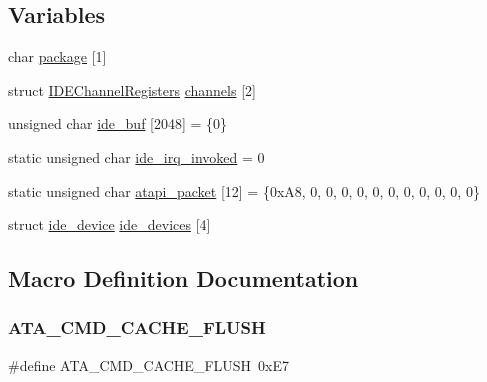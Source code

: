 \subsection*{Variables}
\begin{DoxyCompactItemize}
\item 
char \hyperlink{a00005_ae11222fc133cc5f2cb1b16155fee8b43_ae11222fc133cc5f2cb1b16155fee8b43}{package} \mbox{[}1\mbox{]}
\item 
struct \hyperlink{a00069}{I\+D\+E\+Channel\+Registers} \hyperlink{a00005_aecefa15f62cf60846ddb1a56f9153143_aecefa15f62cf60846ddb1a56f9153143}{channels} \mbox{[}2\mbox{]}
\item 
unsigned char \hyperlink{a00005_a94f78e77f368421e4fe8faea979d523f_a94f78e77f368421e4fe8faea979d523f}{ide\+\_\+buf} \mbox{[}2048\mbox{]} = \{0\}
\item 
static unsigned char \hyperlink{a00005_a12985ec2f925d0cdbd7d24728b9849f9_a12985ec2f925d0cdbd7d24728b9849f9}{ide\+\_\+irq\+\_\+invoked} = 0
\item 
static unsigned char \hyperlink{a00005_a02351861ecf3191d5dbbcc1910b7c109_a02351861ecf3191d5dbbcc1910b7c109}{atapi\+\_\+packet} \mbox{[}12\mbox{]} = \{0x\+A8, 0, 0, 0, 0, 0, 0, 0, 0, 0, 0, 0\}
\item 
struct \hyperlink{a00073}{ide\+\_\+device} \hyperlink{a00005_a16b42e578786d8541c2cb27334803fa0_a16b42e578786d8541c2cb27334803fa0}{ide\+\_\+devices} \mbox{[}4\mbox{]}
\end{DoxyCompactItemize}


\subsection{Macro Definition Documentation}
\mbox{\label{a00005_a23e8deb17b95336898b52cc76d5206af_a23e8deb17b95336898b52cc76d5206af}} 
\subsubsection{\texorpdfstring{A\+T\+A\+\_\+\+C\+M\+D\+\_\+\+C\+A\+C\+H\+E\+\_\+\+F\+L\+U\+SH}{ATA\_CMD\_CACHE\_FLUSH}}
{\footnotesize\ttfamily \#define A\+T\+A\+\_\+\+C\+M\+D\+\_\+\+C\+A\+C\+H\+E\+\_\+\+F\+L\+U\+SH~0x\+E7}



